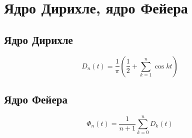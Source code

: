 \documentclass[paper=a4, fontsize=14pt]{article}
\begin{document}
\section{Ядро Дирихле, ядро Фейера}

\subsection{Ядро Дирихле}

$$ D_n(t) = \frac{1}{\pi}( \frac{1}{2} + \sum_{k = 1}^{n} \cos kt) $$

\subsection{Ядро Фейера}

$$ \Phi_n(t) = \frac{1}{n+1} \sum_{k = 0}^{n} D_k(t) $$
\end{document}
